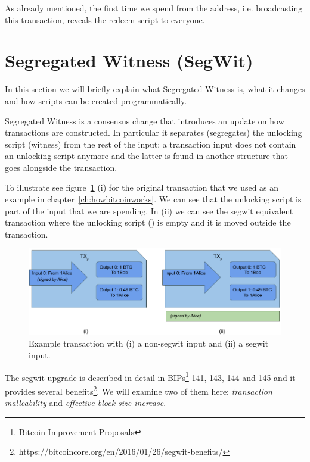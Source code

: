 \begin{note}
As already mentioned, the first time we spend from the address, i.e. broadcasting this transaction, reveals the redeem script to everyone.
\end{note}



\section{Segregated Witness (SegWit)}
\label{sec:segwit}

In this section we will briefly explain what Segregated Witness is, what it changes and how scripts can be created programmatically. 

Segregated Witness is a consensus change that introduces an update on how transactions are constructed. In particular it separates (segregates) the unlocking script (witness) from the rest of the input; a transaction input does not contain an unlocking script anymore and the latter is found in another structure that goes alongside the transaction. 

To illustrate see figure~\ref{fig:tx-with-without-segwit} (i) for the original transaction that we used as an example in chapter~\ref{ch:howbitcoinworks}. We can see that the unlocking script is part of the input that we are spending. In (ii) we can see the segwit equivalent transaction where the unlocking script () is empty and it is moved outside the transaction.

\begin{figure}[H]
\begin{center}
\includegraphics[scale=0.5]{images/tx-with-without-segwit}
\caption{Example transaction with (i) a non-segwit input and (ii) a segwit input.}
\label{fig:tx-with-without-segwit}
\end{center}
\end{figure}

The segwit upgrade is described in detail in BIPs\footnote{Bitcoin Improvement Proposals} 141, 143, 144 and 145 and it provides several benefits\footnote{https://bitcoincore.org/en/2016/01/26/segwit-benefits/}. We will examine two of them here: \emph{transaction malleability} and \emph{effective block size increase}.

